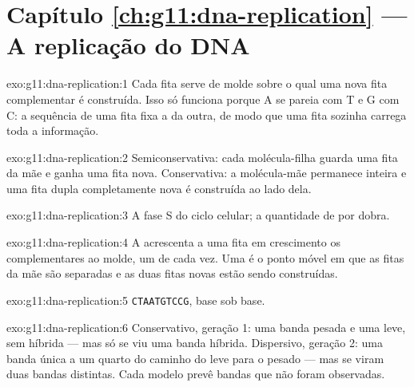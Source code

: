 \section*{Capítulo \ref{ch:g11:dna-replication} --- A replicação do DNA}

\begin{solution}{exo:g11:dna-replication:1}
Cada fita serve de molde sobre o qual uma nova fita complementar é
construída. Isso só funciona porque A se pareia com T e G com C: a
sequência de uma fita fixa a da outra, de modo que uma fita sozinha
carrega toda a informação.
\end{solution}

\begin{solution}{exo:g11:dna-replication:2}
Semiconservativa: cada molécula-filha guarda uma fita da mãe e ganha
uma fita nova. Conservativa: a molécula-mãe permanece inteira e uma
fita dupla completamente nova é construída ao lado dela.
\end{solution}

\begin{solution}{exo:g11:dna-replication:3}
A fase S do ciclo celular; a quantidade de  por  dobra.
\end{solution}

\begin{solution}{exo:g11:dna-replication:4}
A  acrescenta a uma fita em crescimento os 
complementares ao molde, um de cada vez. Uma  é
o ponto móvel em que as fitas da mãe são separadas e as duas fitas
novas estão sendo construídas.
\end{solution}

\begin{solution}{exo:g11:dna-replication:5}
\texttt{CTAATGTCCG}, base sob base.
\end{solution}

\begin{solution}{exo:g11:dna-replication:6}
Conservativo, geração 1: uma banda pesada e uma leve, sem híbrida ---
mas só se viu uma banda híbrida. Dispersivo, geração 2: uma banda única
a um quarto do caminho do leve para o pesado --- mas se viram duas
bandas distintas. Cada modelo prevê bandas que não foram observadas.
\end{solution}

